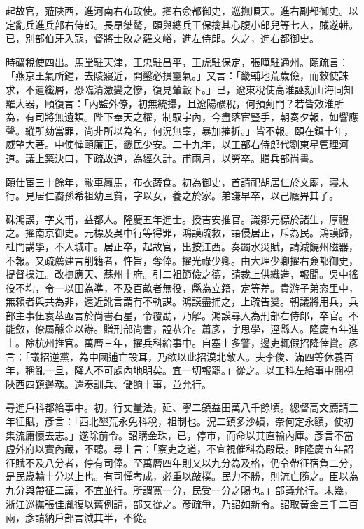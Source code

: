 \begin{pinyinscope}
起故官，蒞陜西，進河南右布政使。擢右僉都御史，巡撫順天。進右副都御史。以定亂兵進兵部右侍郎。長昂桀驁，頤與總兵王保擒其心腹小郎兒等七人，賊遂軿。已，別部伯牙入寇，督將士敗之羅文峪，進左侍郎。久之，進右都御史。

時礦稅使四出。馬堂駐天津，王忠駐昌平，王虎駐保定，張曄駐通州。頤疏言：「燕京王氣所鐘，去陵寢近，開鑿必損靈氣。」又言：「畿輔地荒歲儉，而敕使誅求，不遺纖屑，恐臨清激變之慘，復見輦轂下。」已，遼東稅使高淮誣劾山海同知羅大器，頤復言：「內監外僚，初無統攝，且遼陽礦稅，何預薊門？若皆效淮所為，有司將無遺類。陛下奉天之權，制馭宇內，今盡落宦豎手，朝奏夕報，如響應聲。縱所劾當罪，尚非所以為名，何況無辜，暴加摧折。」皆不報。頤在鎮十年，威望大著。中使憚頤廉正，畿民少安。二十九年，以工部右侍郎代劉東星管理河道。議上築決口，下疏故道，為經久計。甫兩月，以勞卒。贈兵部尚書。

頤仕宦三十餘年，敝車羸馬，布衣蔬食。初為御史，首請祀胡居仁於文廟，寢未行。見居仁裔孫希祖幼且貧，字以女，養之於家。弟謙早卒，以己廕畀其子。

硃鴻謨，字文甫，益都人。隆慶五年進士。授吉安推官。識鄒元標於諸生，厚禮之。擢南京御史。元標及吳中行等得罪，鴻謨疏救，語侵居正，斥為民。鴻謨歸，杜門講學，不入城市。居正卒，起故官，出按江西。奏蠲水災賦，請減饒州磁器，不報。又疏薦建言削籍者，忤旨，奪俸。擢光祿少卿。由大理少卿擢右僉都御史，提督操江。改撫應天、蘇州十府。引二祖節儉之德，請裁上供織造，報聞。吳中徭役不均，令一以田為準，不及百畝者無役，縣為立籍，定等差。貴游子弟恣里中，無賴者與共為非，遠近訛言謂有不軌謀。鴻謨盡捕之，上疏告變。朝議將用兵，兵部主事伍袁萃亟言於尚書石星，令覆勘，乃解。鴻謨尋入為刑部右侍郎，卒官。不能斂，僚屬醵金以辦。贈刑部尚書，謚恭介。蕭彥，字思學，涇縣人。隆慶五年進士。除杭州推官。萬曆三年，擢兵科給事中。自塞上多警，邊吏輒假招降倖賞。彥言：「議招逆黨，為中國逋亡設耳，乃欲以此招漠北敵人。夫李俊、滿四等休養百年，稱亂一旦，降人不可處內地明矣。宜一切報罷。」從之。以工科左給事中閱視陜西四鎮邊務。還奏訓兵、儲餉十事，並允行。

尋進戶科都給事中。初，行丈量法，延、寧二鎮益田萬八千餘頃。總督高文薦請三年征賦，彥言：「西北墾荒永免科稅，祖制也。況二鎮多沙磧，奈何定永額，使初集流庸懷去志。」遂除前令。詔購金珠，已，停市，而命以其直輸內庫。彥言不當虛外府以實內藏，不聽。尋上言：「察吏之道，不宜視催科為殿最。昨隆慶五年詔征賦不及八分者，停有司俸。至萬曆四年則又以九分為及格，仍令帶征宿負二分，是民歲輸十分以上也。有司憚考成，必重以敲撲。民力不勝，則流亡隨之。臣以為九分與帶征二議，不宜並行。所謂寬一分，民受一分之賜也。」部議允行。未幾，浙江巡撫張佳胤復以舊例請，部又從之。彥疏爭，乃詔如新令。詔取黃金三千二百兩，彥請納戶部言減其半，不從。


\end{pinyinscope}
